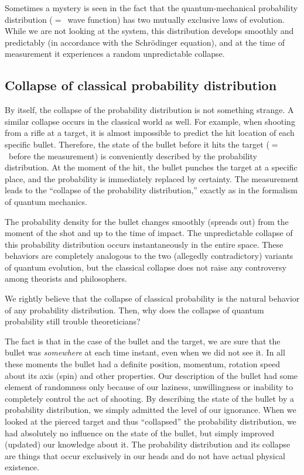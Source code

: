 \documentclass[nochecklpage]{stefan1}
\theoremstyle{definition}
\begin{document}
Sometimes a mystery is seen in the fact that the quantum-mechanical
probability distribution ($=$~wave function) has two mutually exclusive
laws of evolution. While we are not looking at the system, this
distribution develops smoothly and predictably (in accordance with the
Schr\"{o}dinger equation), and at the time of measurement it experiences
a random unpredictable collapse.

\subsection{Collapse of classical probability distribution}\label{ss:unpredictability3}
By itself, the collapse of the probability distribution is not something
strange. A similar collapse occurs in the classical world as well. For example,
when shooting from a rifle at a target, it is almost impossible to
predict the hit location of each specific bullet. Therefore, the state
of the bullet before it hits the target ($=$~before the measurement) is
conveniently described by the probability distribution. At the moment
of the hit, the bullet punches the target at a specific place, and the
probability is immediately replaced by certainty. The measurement leads
to the ``collapse of the probability distribution,'' exactly as in the
formalism of quantum mechanics.

The probability density for the bullet changes smoothly (spreads out)
from the moment of the shot and up to the time of impact. The
unpredictable collapse of this probability distribution occurs
instantaneously in the entire space. These behaviors are completely
analogous to the two (allegedly contradictory) variants of quantum
evolution, but the classical collapse does not raise any controversy among
theorists and philosophers.

We rightly believe that the collapse of classical probability is the
natural behavior of any probability distribution. Then, why does the
collapse of quantum probability still trouble theoreticians?

The fact is that in the case of the bullet and the target, we are sure
that the bullet was \emph{somewhere} at each time instant, even when we did
not see it. In all these moments the bullet had a definite position,
momentum, rotation speed about its axis (spin) and other properties. Our
description of the bullet had some element of randomness only because
of our laziness, unwillingness or inability to completely control the
act of shooting. By describing the state of the bullet by a probability
distribution, we simply admitted the level of our ignorance. When we
looked at the pierced target and thus ``collapsed'' the probability
distribution, we had absolutely no influence on the state of the bullet,
but simply improved (updated) our knowledge about it. The probability
distribution and its collapse are things that occur exclusively in our
heads and do not have actual physical existence.
\end{document}
